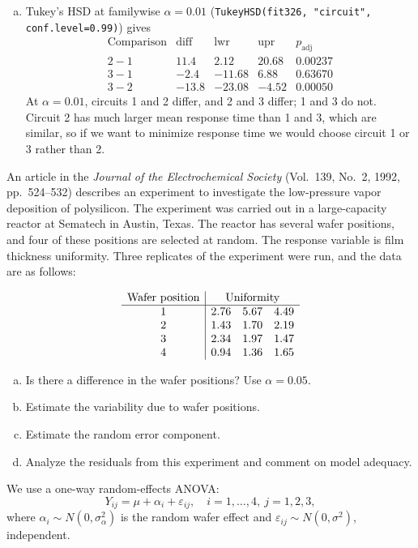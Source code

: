 \documentclass[answers,12pt,addpoints]{exam}
\begin{document}
\begin{questions}
\begin{solution}
\begin{enumerate}[(a)]
\item Tukey’s HSD at familywise $\alpha=0.01$ (\verb|TukeyHSD(fit326, "circuit", conf.level=0.99)|) gives
\[
\begin{array}{c|rrrr}
\text{Comparison} & \text{diff} & \text{lwr} & \text{upr} & p_{\text{adj}}\\
\hline
2-1 & 11.4  & 2.12  & 20.68 & 0.00237\\
3-1 & -2.4  & -11.68& 6.88  & 0.63670\\
3-2 & -13.8 & -23.08& -4.52 & 0.00050
\end{array}
\]
At $\alpha=0.01$, circuits 1 and 2 differ, and 2 and 3 differ; 1 and 3 do not. Circuit 2 has much larger mean response time than 1 and 3, which are similar, so if we want to minimize response time we would choose circuit 1 or 3 rather than 2.
\end{enumerate}
\end{solution}


An article in the \emph{Journal of the Electrochemical Society} (Vol.~139, No.~2, 1992, pp.~524--532) describes an experiment to investigate the low-pressure vapor deposition of polysilicon. The experiment was carried out in a large-capacity reactor at Sematech in Austin, Texas. The reactor has several wafer positions, and four of these positions are selected at random. The response variable is film thickness uniformity. Three replicates of the experiment were run, and the data are as follows:

\[
\begin{array}{c|ccc}
\text{Wafer position} & \multicolumn{3}{c}{\text{Uniformity}}\\
\hline
1 & 2.76 & 5.67 & 4.49\\
2 & 1.43 & 1.70 & 2.19\\
3 & 2.34 & 1.97 & 1.47\\
4 & 0.94 & 1.36 & 1.65
\end{array}
\]

\begin{enumerate}[(a)]
\item Is there a difference in the wafer positions? Use $\alpha = 0.05$.
\item Estimate the variability due to wafer positions.
\item Estimate the random error component.
\item Analyze the residuals from this experiment and comment on model adequacy.
\end{enumerate}

\begin{solution}
We use a one-way random-effects ANOVA:
\[
Y_{ij} = \mu + \alpha_i + \varepsilon_{ij},\quad i=1,\dots,4,\ j=1,2,3,
\]
where $\alpha_i\sim N(0,\sigma_\alpha^2)$ is the random wafer effect and $\varepsilon_{ij}\sim N(0,\sigma^2)$, independent.


\end{solution}
\end{questions}
\end{document}
